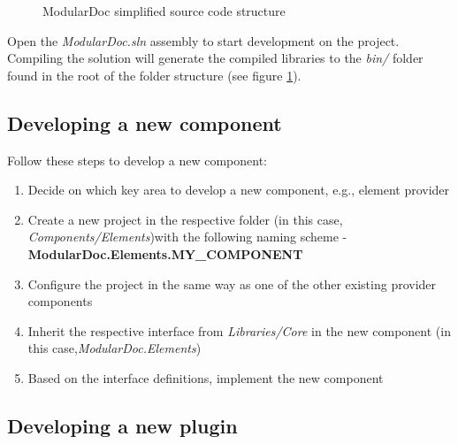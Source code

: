 \begin{figure}[H]
    \caption{ModularDoc simplified source code structure}
    \label{fig:sourceCodeFileStructure}
\end{figure}

Open the \textit{ModularDoc.sln} assembly to start development on the project.
Compiling the solution will generate the compiled libraries to the \textit{bin/} folder found in the root of the folder structure (see figure \ref{fig:sourceCodeFileStructure}).

\subsection{Developing a new component}

Follow these steps to develop a new component:
\begin{enumerate}
    \item Decide on which key area to develop a new component, e.g., element provider
    \item Create a new project in the respective folder (in this case, \textit{Components/Elements})\linebreak with the following naming scheme - \textbf{ModularDoc.Elements.MY\_COMPONENT}
    \item Configure the project in the same way as one of the other existing provider components
    \item Inherit the respective interface from \textit{Libraries/Core} in the new component (in this case,\linebreak \textit{ModularDoc.Elements})
    \item Based on the interface definitions, implement the new component
\end{enumerate}

\pagebreak
\subsection{Developing a new plugin}

